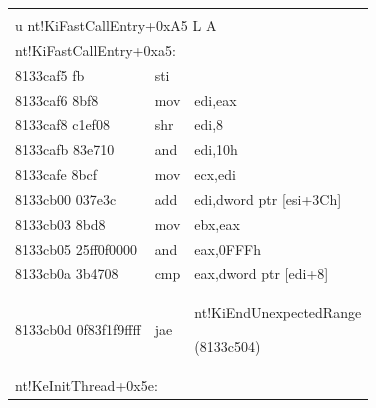   \begin{table}[h]\small %


  \vspace*{3pt}


  \begin{center}







  


  \begin{tabular}{|lll|}


  \hline


  &&\\[-9pt]


\multicolumn{3}{|l|}{{\sf u nt!KiFastCallEntry\;+\;0xA5 L A}}\\


\multicolumn{3}{|l|}{{\sf nt!KiFastCallEntry+0xa5:}}\\


{\sf 8133caf5 fb }&    {\sf    sti}&\\


{\sf 8133caf6 8bf8   }    &   {\sf mov}&{\sf     edi,eax}\\


{\sf 8133caf8 c1ef08} &   {\sf shr}&   {\sf  edi,8}\\


{\sf 8133cafb 83e710} &{\sf    and}&{\sf     edi,10h}\\


{\sf 8133cafe 8bcf    }   &   {\sf mov}&   {\sf  ecx,edi}\\


{\sf 8133cb00 037e3c }&  {\sf  add}& {\sf    edi,dword ptr [esi+3Ch]}\\


{\sf 8133cb03 8bd8   }&   {\sf mov}&    {\sf ebx,eax}\\


{\sf 8133cb05 25ff0f0000} &  {\sf  and}& {\sf    eax,0FFFh}\\


{\sf 8133cb0a 3b4708 }&   {\sf cmp}&   {\sf  eax,dword ptr [edi+8]}\\


{\sf 8133cb0d 0f83f1f9ffff}&{\sf   jae} &{\sf    nt!KiEndUnexpectedRange  


(8133c504)}\\


\multicolumn{3}{|l|}{{\sf nt!KeInitThread+0x5e:}}\\



\end{tabular}
\end{center}
\end{table}
